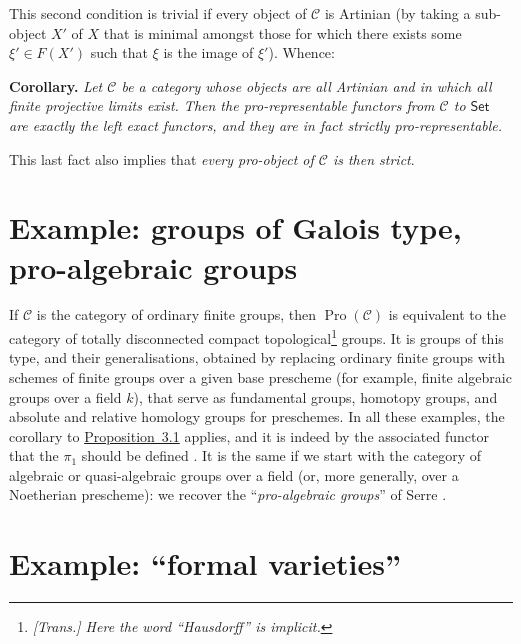 \documentclass{article}
\newenvironment{itenv}[1]
  {\par\medskip\noindent\textbf{#1.}\itshape}
  {\medskip}
\renewcommand{\cal}[1]{{\mathcal{#1}}}
\newcommand{\Set}{\mathsf{Set}}
\DeclareMathOperator{\Pro}{Pro}
\begin{document}
This second condition is trivial if every object of $\cal{C}$ is Artinian (by taking a sub-object $X'$ of $X$ that is minimal amongst those for which there exists some $\xi'\in F(X')$ such that $\xi$ is the image of $\xi'$).
Whence:

\begin{itenv}{Corollary}
  Let $\cal{C}$ be a category whose objects are all Artinian and in which all finite projective limits exist.
  Then the pro-representable functors from $\cal{C}$ to $\Set$ are exactly the left exact functors, and they are in fact strictly pro-representable.
\end{itenv}

This last fact also implies that \emph{every pro-object of $\cal{C}$ is then strict}.


\section{Example: groups of Galois type, pro-algebraic groups}
\label{A.4}

If $\cal{C}$ is the category of ordinary finite groups, then $\Pro(\cal{C})$ is equivalent to the category of totally disconnected compact topological\footnote{\emph{[Trans.] Here the word ``Hausdorff'' is implicit.}} groups.
It is groups of this type, and their generalisations, obtained by replacing ordinary finite groups with schemes of finite groups over a given base prescheme (for example, finite algebraic groups over a field $k$), that serve as fundamental groups, homotopy groups, and absolute and relative homology groups for preschemes.
In all these examples, the corollary to \hyperref[A.3-proposition1]{Proposition~3.1} applies, and it is indeed by the associated functor that the $\pi_1$ should be defined \cite{2}.
It is the same if we start with the category of algebraic or quasi-algebraic groups over a field (or, more generally, over a Noetherian prescheme): we recover the ``\emph{pro-algebraic groups}'' of Serre \cite{4}.


\section{Example: ``formal varieties''}
\label{A.5}
\end{document}
